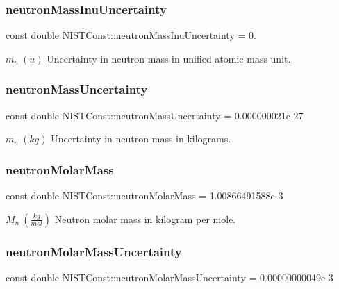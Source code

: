 \subsubsection{\texorpdfstring{neutron\+Mass\+Inu\+Uncertainty}{neutronMassInuUncertainty}}
{\footnotesize\ttfamily const double N\+I\+S\+T\+Const\+::neutron\+Mass\+Inu\+Uncertainty = 0.}

$m_n \ (u)$ Uncertainty in neutron mass in unified atomic mass unit. \mbox{\label{group___n_i_s_t_const-_neutron_gacce8fdd0e4017cd74864a675cd18ca82}} 
\subsubsection{\texorpdfstring{neutron\+Mass\+Uncertainty}{neutronMassUncertainty}}
{\footnotesize\ttfamily const double N\+I\+S\+T\+Const\+::neutron\+Mass\+Uncertainty = 0.\+000000021e-\/27}

$m_n \ (kg)$ Uncertainty in neutron mass in kilograms. \mbox{\label{group___n_i_s_t_const-_neutron_ga0f7ab7fc272f54c17ecf777efff7003b}} 
\subsubsection{\texorpdfstring{neutron\+Molar\+Mass}{neutronMolarMass}}
{\footnotesize\ttfamily const double N\+I\+S\+T\+Const\+::neutron\+Molar\+Mass = 1.\+00866491588e-\/3}

$M_n \ (\frac{kg}{mol})$ Neutron molar mass in kilogram per mole. \mbox{\label{group___n_i_s_t_const-_neutron_ga1b4a0903f80697bbb3343767351da3ab}} 
\subsubsection{\texorpdfstring{neutron\+Molar\+Mass\+Uncertainty}{neutronMolarMassUncertainty}}
{\footnotesize\ttfamily const double N\+I\+S\+T\+Const\+::neutron\+Molar\+Mass\+Uncertainty = 0.\+00000000049e-\/3}

